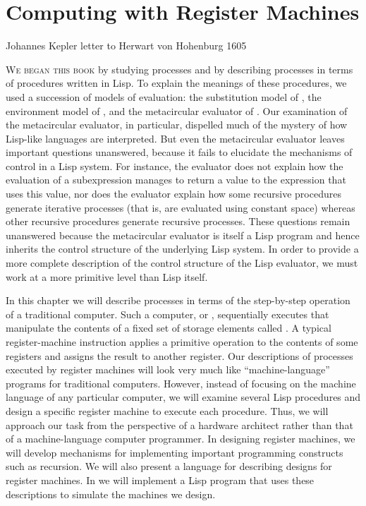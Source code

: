 \chapter{Computing with Register Machines}
\label{Chapter 5}

  {Johannes Kepler}
  {letter to Herwart von Hohenburg}
  {1605}

\noindent
\lettrine{W}{e began this book} by studying processes and by describing processes in terms
of procedures written in Lisp.  To explain the meanings of these procedures, we
used a succession of models of evaluation: the substitution model of
, the environment model of , and the metacircular
evaluator of .  Our examination of the metacircular evaluator,
in particular, dispelled much of the mystery of how Lisp-like languages are
interpreted.  But even the metacircular evaluator leaves important questions
unanswered, because it fails to elucidate the mechanisms of control in a Lisp
system.  For instance, the evaluator does not explain how the evaluation of a
subexpression manages to return a value to the expression that uses this value,
nor does the evaluator explain how some recursive procedures generate iterative
processes (that is, are evaluated using constant space) whereas other recursive
procedures generate recursive processes.  These questions remain unanswered
because the metacircular evaluator is itself a Lisp program and hence inherits
the control structure of the underlying Lisp system.  In order to provide a
more complete description of the control structure of the Lisp evaluator, we
must work at a more primitive level than Lisp itself.

In this chapter we will describe processes in terms of the step-by-step
operation of a traditional computer.  Such a computer, or , sequentially executes  that manipulate the
contents of a fixed set of storage elements called .  A
typical register-machine instruction applies a primitive operation to the
contents of some registers and assigns the result to another register.  Our
descriptions of processes executed by register machines will look very much
like ``machine-language'' programs for traditional computers.  However, instead
of focusing on the machine language of any particular computer, we will examine
several Lisp procedures and design a specific register machine to execute each
procedure.  Thus, we will approach our task from the perspective of a hardware
architect rather than that of a machine-language computer programmer.  In
designing register machines, we will develop mechanisms for implementing
important programming constructs such as recursion.  We will also present a
language for describing designs for register machines.  In  we
will implement a Lisp program that uses these descriptions to simulate the
machines we design.


